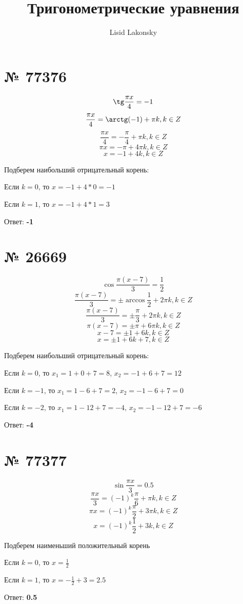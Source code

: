\documentclass[11pt]{article} %
\title{Тригонометрические уравнения}
\author{Lisid Lakonsky}
\begin{document}
\maketitle

\section{№ \textbf{77376}}

$$\tg \frac{\pi x}{4} = -1$$
$$\frac{\pi x}{4} = \arctg (-1) + \pi k, k \in Z$$
$$\frac{\pi x}{4} = -\frac{\pi}{4} + \pi k, k \in Z$$
$$\pi x = -\pi + 4\pi k, k \in Z$$
$$x = -1 + 4k, k \in Z$$

Подберем наибольший отрицательный корень:

Если $k = 0$, то $x = -1 + 4 * 0 = -1$

Если $k = 1$, то $x = -1 + 4 * 1 = 3$

Ответ: \textbf{-1}

\section{№ \textbf{26669}}

$$\cos \frac{\pi(x - 7)}{3} = \frac{1}{2}$$
$$\frac{\pi(x - 7)}{3} = \pm \arccos \frac{1}{2} + 2 \pi k, k \in Z$$
$$\frac{\pi(x - 7)}{3} = \pm \frac{\pi}{3} + 2 \pi k, k \in Z$$
$$\pi(x - 7) = \pm \pi + 6 \pi k, k \in Z$$
$$x - 7 = \pm 1 + 6k, k \in Z$$
$$x = \pm 1 + 6k + 7, k \in Z$$

Подберем наибольший отрицательный корень:

Если $k = 0$, то $x_1 = 1 + 0 + 7 = 8$, $x_2 = -1 + 6 + 7 = 12$

Если $k = -1$, то $x_1 = 1 - 6 + 7 = 2$, $x_2 = -1 - 6 + 7 = 0$

Если $k = -2$, то $x_1 = 1 - 12 + 7 = -4$, $x_2 = -1 - 12 + 7 = -6$

Ответ: \textbf{-4}

\section{№ \textbf{77377}}

$$\sin \frac{\pi x}{3} = 0.5$$
$$\frac{\pi x}{3} = (-1)^k \frac{\pi}{6} + \pi k, k \in Z$$
$$\pi x = (-1)^k \frac{\pi}{2} + 3 \pi k, k \in Z$$
$$x = (-1)^k \frac{1}{2} + 3k, k \in Z$$

Подберем наименьший положительный корень

Если $k = 0$, то $x = \frac{1}{2}$

Если $k = 1$, то $x = -\frac{1}{2} + 3 = 2.5$

Ответ: \textbf{0.5}
\end{document}
